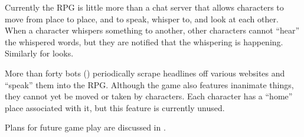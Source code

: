 Currently the RPG is little more than a chat server that allows
characters to move from place to place, and to speak, whisper to, and
look at each other.
When a character whispers something to another, other characters
cannot ``hear'' the whispered words, but they are notified that the
whispering is happening.
Similarly for looks.

More than forty bots () periodically scrape
headlines off various websites and ``speak'' them into the RPG\@.
Although the game also features inanimate things, they cannot yet be
moved or taken by characters.
Each character has a ``home'' place associated with it, but this
feature is currently unused.

Plans for future game play are discussed in .
